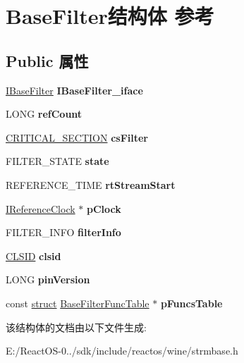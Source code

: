 \hypertarget{struct_base_filter}{}\section{Base\+Filter结构体 参考}
\label{struct_base_filter}
\subsection*{Public 属性}
\begin{DoxyCompactItemize}
\item 
\mbox{\label{struct_base_filter_a081d4be7003d4f12dad6415d76385c78}} 
\hyperlink{interface_i_base_filter}{I\+Base\+Filter} {\bfseries I\+Base\+Filter\+\_\+iface}
\item 
\mbox{\label{struct_base_filter_a8e85ff7685315fa184b482482da4cee6}} 
L\+O\+NG {\bfseries ref\+Count}
\item 
\mbox{\label{struct_base_filter_aa2d2d154985fed13346299276b93aa4e}} 
\hyperlink{struct___c_r_i_t_i_c_a_l___s_e_c_t_i_o_n}{C\+R\+I\+T\+I\+C\+A\+L\+\_\+\+S\+E\+C\+T\+I\+ON} {\bfseries cs\+Filter}
\item 
\mbox{\label{struct_base_filter_ae5ab1a944ac94dfdaf2828aefcab71bd}} 
F\+I\+L\+T\+E\+R\+\_\+\+S\+T\+A\+TE {\bfseries state}
\item 
\mbox{\label{struct_base_filter_a84b892778795dda00de9001f344c83ad}} 
R\+E\+F\+E\+R\+E\+N\+C\+E\+\_\+\+T\+I\+ME {\bfseries rt\+Stream\+Start}
\item 
\mbox{\label{struct_base_filter_acfc14c0f5fb0fafbbd0d19ad38536d24}} 
\hyperlink{interface_i_reference_clock}{I\+Reference\+Clock} $\ast$ {\bfseries p\+Clock}
\item 
\mbox{\label{struct_base_filter_af531ca4147e871abe13797699628c795}} 
F\+I\+L\+T\+E\+R\+\_\+\+I\+N\+FO {\bfseries filter\+Info}
\item 
\mbox{\label{struct_base_filter_af190e055b3a40f12dbc63a4aff5928a6}} 
\hyperlink{struct___i_i_d}{C\+L\+S\+ID} {\bfseries clsid}
\item 
\mbox{\label{struct_base_filter_a5ee3a7c0d997312561a6512a8c7e1747}} 
L\+O\+NG {\bfseries pin\+Version}
\item 
\mbox{\label{struct_base_filter_abece54b0209f9b5f2b7ec66f386fd9c8}} 
const \hyperlink{interfacestruct}{struct} \hyperlink{struct_base_filter_func_table}{Base\+Filter\+Func\+Table} $\ast$ {\bfseries p\+Funcs\+Table}
\end{DoxyCompactItemize}


该结构体的文档由以下文件生成\+:\begin{DoxyCompactItemize}
\item 
E\+:/\+React\+O\+S-\/0../sdk/include/reactos/wine/strmbase.\+h\end{DoxyCompactItemize}
